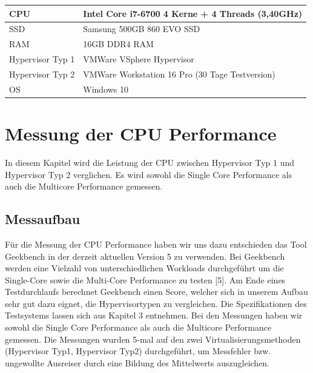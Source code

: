 \documentclass[conference]{IEEEtran}
\begin{document}
\begin{table}[!h]
\begin{tabular}{|l|l|}
\hline
CPU              & Intel Core i7-6700 4 Kerne + 4 Threads (3,40GHz) \\ \hline
SSD              & Samsung 500GB 860 EVO SSD                        \\ \hline
RAM              & 16GB DDR4 RAM                                    \\ \hline
Hypervisor Typ 1 & VMWare VSphere Hypervisor                        \\ \hline
Hypervisor Typ 2 & VMWare Workstation 16 Pro (30 Tage Testversion)  \\ \hline
OS               & Windows 10                                       \\ \hline
\end{tabular}
\end{table}

\section{Messung der CPU Performance}
\label{Messung der CPU Performance}
In diesem Kapitel wird die Leistung der CPU zwischen Hypervisor Typ 1 und Hypervisor Typ 2 verglichen. Es wird sowohl die Single Core Performance als auch die Multicore Performance gemessen.

\subsection{Messaufbau}
Für die Messung der CPU Performance haben wir uns dazu entschieden das Tool Geekbench in der derzeit aktuellen Version 5 zu verwenden. Bei Geekbench werden eine Vielzahl von unterschiedlichen Workloads durchgeführt um die Single-Core sowie die Multi-Core Performance zu testen [5]. Am Ende eines Testdurchlaufs berechnet Geekbench einen Score, welcher sich in unserem Aufbau sehr gut dazu eignet, die Hypervisortypen zu vergleichen. Die Spezifikationen des Testsystems lassen sich aus Kapitel 3 entnehmen.
Bei den Messungen haben wir sowohl die Single Core Performance als auch die Multicore Performance gemessen.  Die Messungen wurden 5-mal auf den zwei Virtualisierungsmethoden (Hypervisor Typ1, Hypervisor Typ2) durchgeführt, um Messfehler bzw. ungewollte Ausreiser durch eine Bildung des Mittelwerts auszugleichen.
\end{document}

